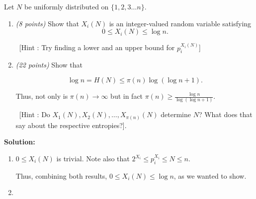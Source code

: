 \documentclass[12pt]{article}
\begin{document}
\begin{enumerate}
Let $N$ be uniformly distributed on $\{1, 2, 3 \ldots n\}$.

\begin{enumerate}
\item {\it (8 points)} Show that  $X_i(N)$ is an integer-valued random variable satisfying 
\begin{equation}
0 \leq X_i(N) \leq \log n.
\end{equation}

~[Hint : Try finding a lower and an upper bound for $p_i^{X_i(N)}$]

\item {\it (22 points)} Show that

\begin{equation}
\log n = H(N) \leq \pi(n) \log( \log n + 1).
\end{equation}

Thus, not only is $\pi(n) \rightarrow \infty$ but in fact  $\pi(n) \geq \frac{\log n}{\log (\log n + 1)} $.

~[Hint : Do $X_1(N), X_2(N), \ldots, X_{\pi(n)}(N)$ determine $N$? What does that say about the respective entropies?].  
\end{enumerate}

%





\vskip 0.2in
\begin{solution}
{\bf Solution:}\\

\begin{enumerate}
\item $0 \leq X_i(N)$ is trivial. Note also that $2^{X_i} \leq p_i^{X_i} \leq N \leq n$. 

Thus, combining both results, $0 \leq X_i(N) \leq \log n$, as we wanted to show.

\item


\end{enumerate}
\end{solution}
\end{enumerate}
\end{document}
